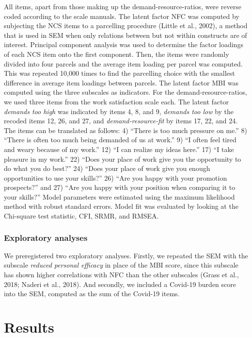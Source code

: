 \documentclass[
  english,
  man,floatsintext]{apa6}
\begin{document}
All items, apart from those making up the demand-resource-ratios, were reverse coded according to the scale manuals.
The latent factor NFC was computed by subjecting the NCS items to a parcelling procedure (Little et al., 2002), a method that is used in SEM when only relations between but not within constructs are of interest.
Principal component analysis was used to determine the factor loadings of each NCS item onto the first component.
Then, the items were randomly divided into four parcels and the average item loading per parcel was computed.
This was repeated 10,000 times to find the parcelling choice with the smallest difference in average item loadings between parcels.
The latent factor MBI was computed using the three subscales as indicators.
For the demand-resource-ratios, we used three items from the work satisfaction scale each.
The latent factor \emph{demands too high} was indicated by items 4, 8, and 9, \emph{demands too low} by the recoded items 12, 26, and 27, and \emph{demand-resource-fit} by items 17, 22, and 24.
The items can be translated as follows: 4) ``There is too much pressure on me.'' 8) ``There is often too much being demanded of us at work.'' 9) ``I often feel tired and weary because of my work.'' 12) ``I can realize my ideas here.'' 17) ``I take pleasure in my work.'' 22) ``Does your place of work give you the opportunity to do what you do best?'' 24) ``Does your place of work give you enough opportunities to use your skills?'' 26) ``Are you happy with your promotion prospects?'' and 27) ``Are you happy with your position when comparing it to your skills?''
Model parameters were estimated using the maximum likelihood method with robust standard errors.
Model fit was evaluated by looking at the Chi-square test statistic, CFI, SRMR, and RMSEA.

\hypertarget{exploratory-analyses}{%
\subsubsection{Exploratory analyses}\label{exploratory-analyses}}

We preregistered two exploratory analyses.
Firstly, we repeated the SEM with the subscale \emph{reduced personal efficacy} in place of the MBI score, since this subscale has shown higher correlations with NFC than the other subscales (Grass et al., 2018; Naderi et al., 2018).
And secondly, we included a Covid-19 burden score into the SEM, computed as the sum of the Covid-19 items.

\hypertarget{results}{%
\section{Results}\label{results}}
\end{document}
